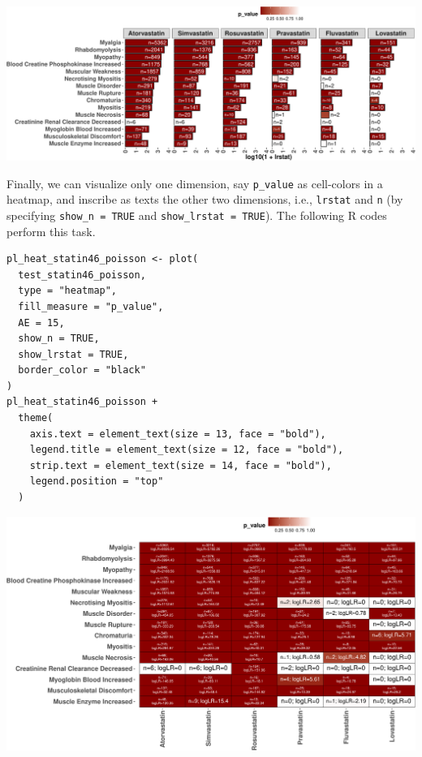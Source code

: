 \begin{center}\includegraphics[width=1\linewidth]{pvlrt-package-paper-Rjournal_files/figure-latex/barplot-poisson-statin46-1} \end{center}

Finally, we can visualize only one dimension, say \texttt{p\_value} as cell-colors in a heatmap, and inscribe as texts the other two dimensions, i.e., \texttt{lrstat} and \texttt{n} (by specifying \texttt{show\_n\ =\ TRUE} and \texttt{show\_lrstat\ =\ TRUE}). The following R codes perform this task.

\begin{verbatim}
pl_heat_statin46_poisson <- plot(
  test_statin46_poisson,
  type = "heatmap",
  fill_measure = "p_value",
  AE = 15,
  show_n = TRUE,
  show_lrstat = TRUE,
  border_color = "black"
)
pl_heat_statin46_poisson +
  theme(
    axis.text = element_text(size = 13, face = "bold"),
    legend.title = element_text(size = 12, face = "bold"),
    strip.text = element_text(size = 14, face = "bold"),
    legend.position = "top"
  )
\end{verbatim}

\begin{center}\includegraphics[width=1\linewidth]{pvlrt-package-paper-Rjournal_files/figure-latex/create-heatmap-poisson-statin46-1} \end{center}

